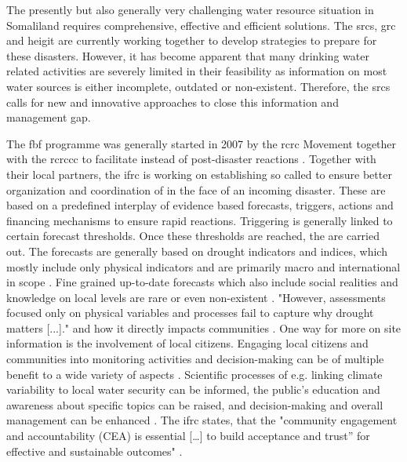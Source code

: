 The presently but also generally very challenging water resource situation in Somaliland requires comprehensive, effective and efficient solutions. The \acrfull{srcs}, \acrfull{grc} and \acrfull{heigit} are currently working together to develop strategies to prepare for these disasters. However, it has become apparent that many drinking water related activities are severely limited in their feasibility as information on most water sources is either incomplete, outdated or non-existent. Therefore, the \acrshort{srcs} calls for new and innovative approaches to close this information and management gap.

The \acrshort{fbf} programme was generally started in 2007 by the \acrlong{rcrc} Movement together with the \acrlong{rcrccc} to facilitate  instead of post-disaster reactions \autocite{ifrcForecastbasedFinancingNew2019}. Together with their local partners, the \acrfull{ifrc} is working on establishing so called  to ensure better organization and coordination of  in the face of an incoming disaster. These  are based on a predefined interplay of evidence based forecasts, triggers, actions and financing mechanisms to ensure rapid reactions.\newline
Triggering  is generally linked to certain forecast thresholds. Once these thresholds are reached, the  are carried out. The forecasts are generally based on drought indicators and indices, which mostly include only physical indicators and are primarily macro and international in scope \autocite{svobodaHandbookDroughtIndicators2016}. Fine grained up-to-date forecasts which also include social realities and knowledge on local levels are rare or even non-existent \autocite{enenkelWhyPredictClimate2020,masindeFrameworkPredictingDroughts2010a}. "However, assessments focused only on physical variables and processes fail to capture why drought matters [...]."\autocite[3]{lackstromBackyardHydroclimatologyCitizen2022} and how it directly impacts communities \autocite{boultDroughtImpactbasedForecasting2022,enenkelWhyPredictClimate2020}.\newline
One way for more on site information is the involvement of local citizens. Engaging local citizens and communities into monitoring activities and decision-making can be of multiple benefit to a wide variety of aspects \autocite{scrsFeasibilityStudyPotential2022, njambi-szlapkaIntegratingCommunityVoices}. Scientific processes of e.g. linking climate variability to local water security can be informed, the public's education and awareness about specific topics can be raised, and decision-making and overall management can be enhanced \autocite{huangManagementDrinkingWater2020,kirschkeCitizenScienceProjects2022,minkmanCitizenScienceWater2015}. The \acrshort{ifrc} states, that the "community engagement and accountability (CEA) is essential [\dots] to build acceptance and trust” for effective and sustainable outcomes" \autocite{ifrcCommunityEngagementAccountability}.\newline


